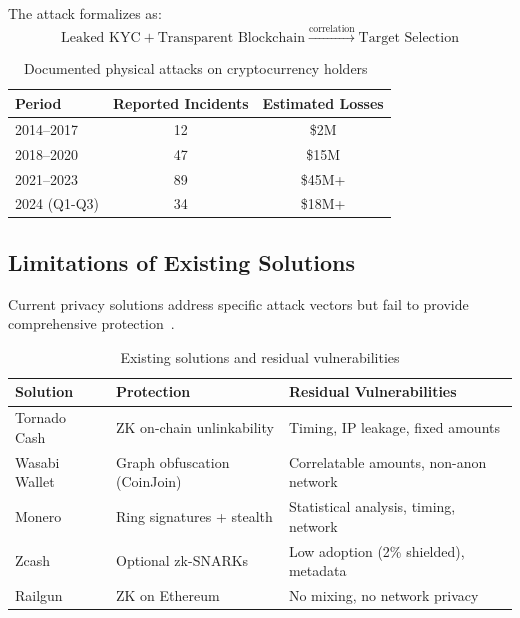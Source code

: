 \documentclass[11pt]{article}
\theoremstyle{definition}
\theoremstyle{plain}
\theoremstyle{remark}
\begin{document}
The attack formalizes as:
\begin{equation}
\text{Leaked KYC} + \text{Transparent Blockchain} \xrightarrow{\text{correlation}} \text{Target Selection}
\end{equation}

\begin{table}[H]
\centering
\caption{Documented physical attacks on cryptocurrency holders~\cite{physicalbitcoin2023}}
\label{tab:attacks}
\begin{tabular}{lcc}
\toprule
\textbf{Period} & \textbf{Reported Incidents} & \textbf{Estimated Losses} \\
\midrule
2014--2017 & 12 & \$2M \\
2018--2020 & 47 & \$15M \\
2021--2023 & 89 & \$45M+ \\
2024 (Q1-Q3) & 34 & \$18M+ \\
\bottomrule
\end{tabular}
\end{table}

\subsection{Limitations of Existing Solutions}

Current privacy solutions address specific attack vectors but fail to provide comprehensive protection~\cite{kumar2017traceability, biryukov2019deanonymization}.

\begin{table}[H]
\centering
\caption{Existing solutions and residual vulnerabilities}
\label{tab:existing}
\begin{tabular}{lll}
\toprule
\textbf{Solution} & \textbf{Protection} & \textbf{Residual Vulnerabilities} \\
\midrule
Tornado Cash~\cite{pertsev2019tornado} & ZK on-chain unlinkability & Timing, IP leakage, fixed amounts \\
Wasabi Wallet~\cite{nopara2018wasabi} & Graph obfuscation (CoinJoin) & Correlatable amounts, non-anon network \\
Monero~\cite{vansaberhagen2013cryptonote} & Ring signatures + stealth & Statistical analysis, timing, network \\
Zcash~\cite{hopwood2016zcash} & Optional zk-SNARKs & Low adoption (2\% shielded), metadata \\
Railgun~\cite{railgun2021} & ZK on Ethereum & No mixing, no network privacy \\
\bottomrule
\end{tabular}
\end{table}
\end{document}
